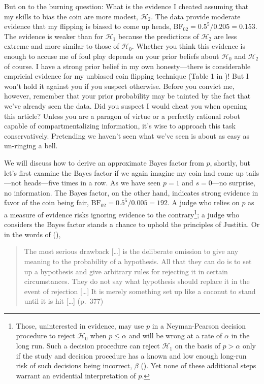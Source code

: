 \documentclass[
  man,
  floatsintext,
  longtable,
  nolmodern,
  notxfonts,
  notimes,
  colorlinks=true,linkcolor=blue,citecolor=blue,urlcolor=blue]{apa7}
\begin{document}
But on to the burning question: What is the evidence I cheated assuming
that my skills to bias the coin are more modest, \(\mathcal{H}_2\). The
data provide moderate evidence that my flipping is biased to come up
heads, \(\text{BF}_{02} = 0.5^5 / 0.205 = 0.153\). The evidence is
weaker than for \(\mathcal{H}_1\) because the predictions of
\(\mathcal{H}_2\) are less extreme and more similar to those of
\(\mathcal{H}_0\). Whether you think this evidence is enough to accuse
me of foul play depends on your prior beliefs about \(\mathcal{H}_0\)
and \(\mathcal{H}_2\) of course. I have a strong prior belief in my own
honesty---there is considerable empricial evidence for my unbiased coin
flipping technique (Table 1 in )! But I won't hold it against you if you suspect otherwise. Before
you convict me, however, remember that your prior probability may be
tainted by the fact that we've already seen the data. Did you suspect I
would cheat you when opening this article? Unless you are a paragon of
virtue or a perfectly rational robot capable of compartmentalizing
information, it's wise to approach this task conservatively. Pretending
we haven't seen what we've seen is about as easy as un-ringing a bell.

We will discuss how to derive an approximate Bayes factor from \(p\),
shortly, but let's first examine the Bayes factor if we again imagine my
coin had come up tails---not heads---five times in a row. As we have
seen \(p = 1\) and \(s = 0\)---no surprise, no information. The Bayes
factor, on the other hand, indicates strong evidence in favor of the
coin being fair, \(\text{BF}_{02} = 0.5^5 / 0.005 = 192\). A judge who
relies on \(p\) as a measure of evidence risks ignoring evidence to the
contrary\footnote{Those, uninterested in evidence, may use \(p\) in a
  Neyman-Pearson decision procedure to reject \(\mathcal{H}_0\) when
  \(p \leq \alpha\) and will be wrong at a rate of \(\alpha\) in the
  long run. Such a decision procedure can reject \(\mathcal{H}_1\) on
  the basis of \(p > \alpha\) only if the study and decision procedure
  has a known and low enough long-run risk of such decisions being
  incorrect, \(\beta\) ().
  Yet none of these additional steps warrant an evidential
  interpretation of \(p\).}; a judge who considers the Bayes factor
stands a chance to uphold the principles of Justitia. Or in the words of
(),

\begin{quote}
The most serious drawback {[}\ldots{]} is the deliberate omission to
give any meaning to the probability of a hypothesis. All that they can
do is to set up a hypothesis and give arbitrary rules for rejecting it
in certain circumstances. They do not say what hypothesis should replace
it in the event of rejection {[}\ldots{]} It is merely something set up
like a coconut to stand until it is hit {[}\ldots{]} (p.~377)
\end{quote}
\end{document}
